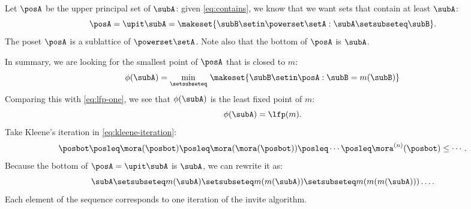 Let $\posA$ be the upper principal set of $\subA$: given \cref{eq:contains}, we know that we want sets that contain at least $\subA$:
\begin{equation}
    \posA = \upit \subA  = \makeset{ \subB \setin \powerset \setA : \subA \setsubseteq \subB }.
\end{equation}
The poset $\posA$ is a sublattice of $\powerset \setA$.
Note also that the bottom of $\posA$ is $\subA$.

In summary, we are looking for the smallest point of $\posA$ that is closed to $m$:
%
\begin{equation}
    \phi(\subA) = \min_{\setsubseteq}\, \makeset{ \subB \setin \posA : \subB = m(\subB) }
\end{equation}
Comparing this with \cref{eq:lfp-one}, we see that $ \phi(\subA)$ is the least fixed point of $m$:
\begin{equation}
    \phi(\subA) = \lfp(m).
\end{equation}
%
Take Kleene's iteration in \cref{eq:kleene-iteration}:
\begin{equation}
    \posbot\posleq \mora(\posbot)\posleq \mora(\mora(\posbot))\posleq\cdots\posleq \mora^{(n)}(\posbot)\leq\cdots.
\end{equation}
Because the bottom of $\posA = \upit \subA$ is $\subA$, we can rewrite it as:
\begin{equation}
    \subA \setsubseteq  m(\subA ) \setsubseteq m(m(\subA)) \setsubseteq m(m(m(\subA))) \dots .
\end{equation}
Each element of the sequence corresponds to one iteration of the invite algorithm.
